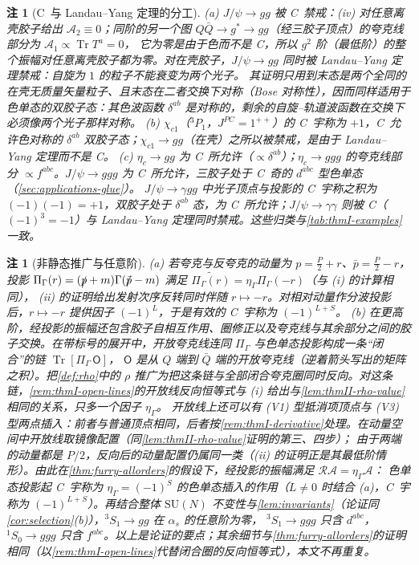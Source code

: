 \documentclass[UTF8,a4paper,11pt,fontset=fandol]{ctexart}
\theoremstyle{cplain}
\theoremstyle{cdefinition}
\theoremstyle{cremark}
\newtheorem{remark}[theorem]{注}
\numberwithin{equation}{section}
\DeclareMathOperator{\Tr}{Tr}
\newcommand{\sla}[1]{\slashed{#1}}                  %
\newcommand{\Rop}{\mathcal{R}}                       %
\newcommand{\Cconj}[1]{\widetilde{#1}}              %
\begin{document}
\begin{remark}[C~与 Landau--Yang 定理的分工]\label{rem:app-onium-LY}
(a) $J/\psi\to gg$ 被 C~禁戒：(iv) 对任意离壳胶子给出 $\mathcal A_2\equiv0$；同阶的另一个图 $Q\bar Q\to g^*\to gg$（经三胶子顶点）的夸克线部分为 $\mathcal A_1\propto\Tr T^a=0$，
它为零是由于色而不是 C，所以 $g^2$ 阶（最低阶）的整个振幅对任意离壳胶子都为零。对在壳胶子，$J/\psi\to gg$ 同时被 Landau--Yang 定理禁戒\cite{Landau1948,Yang1950}：自旋为 $1$ 的粒子不能衰变为两个光子。
其证明只用到末态是两个全同的在壳无质量矢量粒子、且末态在二者交换下对称（Bose 对称性），因而同样适用于色单态的双胶子态：其色波函数 $\delta^{ab}$ 是对称的，剩余的自旋--轨道波函数在交换下必须像两个光子那样对称。
(b) $\chi_{c1}$（${}^3P_1$，$J^{PC}=1^{++}$）的 C~宇称为 $+1$，C~允许色对称的 $\delta^{ab}$ 双胶子态；$\chi_{c1}\to gg$（在壳）之所以被禁戒，是由于 Landau--Yang 定理而不是 C。
(c) $\eta_c\to gg$ 为 C~所允许（$\propto\delta^{ab}$）；$\eta_c\to ggg$ 的夸克线部分 $\propto f^{abc}$。$J/\psi\to ggg$ 为 C~所允许，三胶子处于 C~奇的 $d^{abc}$ 型色单态（\cref{sec:applications-glue}）。
$J/\psi\to\gamma gg$ 中光子顶点与投影的 C~宇称之积为 $(-1)(-1)=+1$，双胶子处于 $\delta^{ab}$ 态，为 C~所允许；$J/\psi\to\gamma\gamma$ 则被 C（$(-1)^3=-1$）与 Landau--Yang 定理同时禁戒。这些归类与\cref{tab:thmI-examples}一致。
\end{remark}

\begin{remark}[非静态推广与任意阶]\label{rem:app-onium-allorders}
(a) 若夸克与反夸克的动量为 $p=\frac P2+r$、$\bar p=\frac P2-r$，投影 $\Pi_\Gamma(r)=(\sla p+m)\Gamma(\sla{\bar p}-m)$ 满足 $\Cconj{\Pi_\Gamma(r)}=\eta_\Gamma\Pi_\Gamma(-r)$（与 (i) 的计算相同），
(ii) 的证明给出发射次序反转同时伴随 $r\mapsto-r$。对相对动量作分波投影后，$r\mapsto-r$ 提供因子 $(-1)^L$，于是有效的 C~宇称为 $(-1)^{L+S}$。
(b) 在更高阶，经投影的振幅还包含胶子自相互作用、圈修正以及夸克线与其余部分之间的胶子交换。在带标号的展开中，开放夸克线连同 $\Pi_\Gamma$ 与色单态投影构成一条“闭合”的链 $\Tr[\Pi_\Gamma\,\mathsf O]$，
$\mathsf O$ 是从 $Q$ 端到 $\bar Q$ 端的开放夸克线（逆着箭头写出的矩阵之积）。把\cref{def:rho}中的 $\rho$ 推广为把这条链与全部闭合夸克圈同时反向。对这条链，\cref{rem:thmI-open-lines}的开放线反向恒等式与 (i) 给出与\cref{lem:thmII-rho-value}相同的关系，只多一个因子 $\eta_\Gamma$。
开放线上还可以有 (V1) 型抵消项顶点与 (V3) 型两点插入：前者与普通顶点相同，后者按\cref{rem:thmI-derivative}处理。在动量空间中开放线取镜像配置（同\cref{lem:thmII-rho-value}证明的第三、四步）；
由于两端的动量都是 $P/2$，反向后的动量配置仍属同一类（(ii) 的证明正是其最低阶情形）。由此在\cref{thm:furry-allorders}的假设下，经投影的振幅满足 $\Rop\mathcal A=\eta_\Gamma\mathcal A$：
色单态投影起 C~宇称为 $\eta_\Gamma=(-1)^S$ 的色单态插入的作用（$L\neq0$ 时结合 (a)，C~宇称为 $(-1)^{L+S}$）。再结合整体 $\mathrm{SU}(N)$ 不变性与\cref{lem:invariants}（论证同\cref{cor:selection}(b)），${}^3S_1\to gg$ 在 $\alpha_s$ 的任意阶为零，
${}^3S_1\to ggg$ 只含 $d^{abc}$，${}^1S_0\to ggg$ 只含 $f^{abc}$。以上是论证的要点；其余细节与\cref{thm:furry-allorders}的证明相同（以\cref{rem:thmI-open-lines}代替闭合圈的反向恒等式），本文不再重复。
\end{remark}
\end{document}
